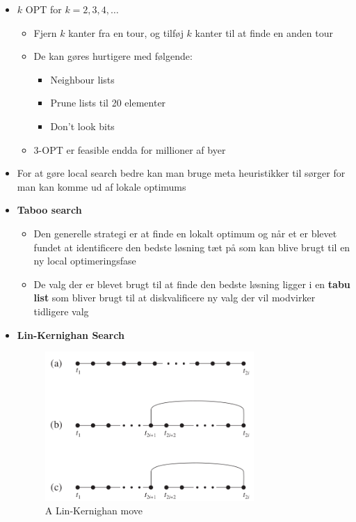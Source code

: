 \begin{itemize}
	\item $k$ OPT for $k = 2, 3, 4, \dots$ 
  \begin{itemize}
  	\item Fjern $k$ kanter fra en tour, og tilføj $k$ kanter til at finde en anden tour 
    \item De kan gøres hurtigere med følgende:
    \begin{itemize}
    	\item Neighbour lists
    	\item Prune lists til 20 elementer
    	\item Don't look bits
    \end{itemize}
    \item 3-OPT er feasible endda for millioner af byer
  \end{itemize}
  \item For at gøre local search bedre kan man bruge meta heuristikker til sørger for man kan komme ud af lokale optimums
  \item \textbf{Taboo search} 
  \begin{itemize}
    \item Den generelle strategi er at finde en lokalt optimum og når et er blevet fundet at identificere den bedste løsning tæt på som kan blive brugt til en ny local optimeringsfase
    \item De valg der er blevet brugt til at finde den bedste løsning ligger i en \textbf{tabu list}  som bliver brugt til at diskvalificere ny valg der vil modvirker tidligere valg
  \end{itemize}
  \item \textbf{Lin-Kernighan Search} 
  \begin{figure}[ht]
    \centering
    \includegraphics[width=300px]{img/lin_kernighan_move}
    \caption{A Lin-Kernighan move\label{fig:kernig}}
  \end{figure}
  \begin{itemize}

\end{itemize}
\end{itemize}
